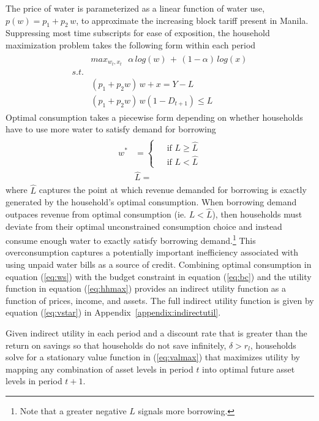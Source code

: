 \documentclass[12pt]{article}
\begin{document}
The price of water is parameterized as a linear function of water use, $p(w) = p_1 + p_2 \, w$, to approximate the increasing block tariff present in Manila.  Suppressing most time subscripts for ease of exposition, the household maximization problem takes the following form within each period
\begin{align}\label{eq:hhmax}
\begin{split}
&max_{w_t,x_t} \,\,\,\, \alpha\, log(w) \, + \, (1-\alpha)\,log(x) \\
s.t.& \\
\,\,\,\, &(p_1 + p_2 w)\,w + x  =  Y - L \\
&(p_1 + p_2 w)\,w (1-D_{t+1}) \leq L  
\end{split}
\end{align}
Optimal consumption takes a piecewise form depending on whether households have to use more water to satisfy demand for borrowing
\begin{align}\label{eq:ws}
\begin{split}
w^{*} &= 
\begin{cases}
 &\text{ if } L \geq \widehat{L} \\
 &\text{ if } L < \widehat{L}
\end{cases} \\
&\widehat{L} = 
\end{split}
\end{align}
where $\widehat{L}$ captures the point at which revenue demanded for borrowing is exactly generated by the household's optimal consumption.  When borrowing demand outpaces revenue from optimal consumption (ie. $L<\widehat{L}$), then households must deviate from their optimal unconstrained consumption choice and instead consume enough water to exactly satisfy borrowing demand.\footnote{Note that a greater negative $L$ signals more borrowing.}  This overconsumption captures a potentially important inefficiency associated with using unpaid water bills as a source of credit.  Combining optimal consumption in equation (\ref{eq:ws}) with the budget constraint in equation (\ref{eq:bc}) and the utility function in equation (\ref{eq:hhmax}) provides an indirect utility function as a function of prices, income, and assets.  The full indirect utility function is given by equation (\ref{eq:vstar}) in Appendix~\ref{appendix:indirectutil}.

Given indirect utility in each period and a discount rate that is greater than the return on savings so that households do not save infinitely, $\delta> r_l$, households solve for a stationary value function in (\ref{eq:valmax}) that maximizes utility by mapping any combination of asset levels in period $t$ into optimal future asset levels in period $t+1$.
\end{document}
